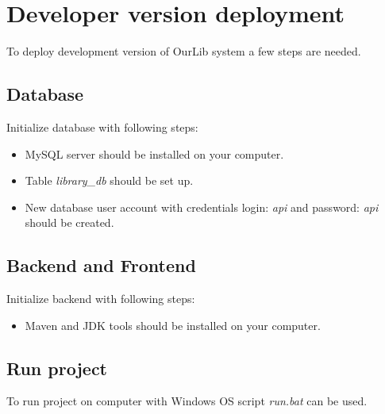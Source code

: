 \section{Developer version deployment}
To deploy development version of OurLib system a few steps are needed.

\subsection{Database}
Initialize database with following steps:
\begin{itemize}
    \item MySQL server should be installed on your computer. 
    \item Table \textit{library\_db} should be set up. 
    \item New database user account with credentials login: \textit{api} and password:  \textit{api} should be created.
\end{itemize}

\subsection{Backend and Frontend}
Initialize backend with following steps:
\begin{itemize}
    \item Maven and JDK tools should be installed on your computer.
\end{itemize}

\subsection{Run project}
To run project on computer with Windows OS script \textit{run.bat} can be used. 